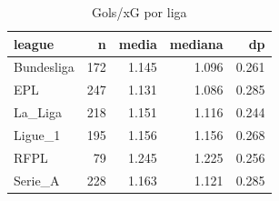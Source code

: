 \begin{table}

\caption{\label{tab:gols_xg_liga_g10}Gols/xG por liga}
\centering
\begin{tabular}[t]{lrrrr}
\toprule
league & n & media & mediana & dp\\
\midrule
Bundesliga & 172 & 1.145 & 1.096 & 0.261\\
EPL & 247 & 1.131 & 1.086 & 0.285\\
La\_Liga & 218 & 1.151 & 1.116 & 0.244\\
Ligue\_1 & 195 & 1.156 & 1.156 & 0.268\\
RFPL & 79 & 1.245 & 1.225 & 0.256\\
\addlinespace
Serie\_A & 228 & 1.163 & 1.121 & 0.285\\
\bottomrule
\end{tabular}
\end{table}

